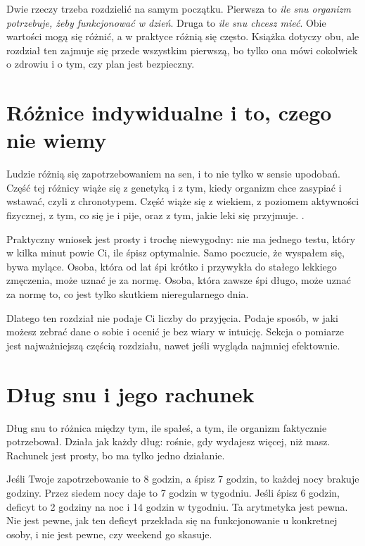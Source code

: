 Dwie rzeczy trzeba rozdzielić na samym początku. Pierwsza to \emph{ile snu organizm potrzebuje, żeby funkcjonować w dzień}. Druga to \emph{ile snu chcesz mieć}. Obie wartości mogą się różnić, a w praktyce różnią się często. Książka dotyczy obu, ale rozdział ten zajmuje się przede wszystkim pierwszą, bo tylko ona mówi cokolwiek o zdrowiu i o tym, czy plan jest bezpieczny.

\section{Różnice indywidualne i to, czego nie wiemy}

Ludzie różnią się zapotrzebowaniem na sen, i to nie tylko w sensie upodobań. Część tej różnicy wiąże się z genetyką i z tym, kiedy organizm chce zasypiać i wstawać, czyli z chronotypem. Część wiąże się z wiekiem, z poziomem aktywności fizycznej, z tym, co się je i pije, oraz z tym, jakie leki się przyjmuje. .

Praktyczny wniosek jest prosty i trochę niewygodny: nie ma jednego testu, który w kilka minut powie Ci, ile śpisz optymalnie. Samo poczucie, że \glqq wyspałem się\grqq{}, bywa mylące. Osoba, która od lat śpi krótko i przywykła do stałego lekkiego zmęczenia, może uznać je za normę. Osoba, która zawsze śpi długo, może uznać za normę to, co jest tylko skutkiem nieregularnego dnia.

Dlatego ten rozdział nie podaje Ci liczby do przyjęcia. Podaje sposób, w jaki możesz zebrać dane o sobie i ocenić je bez wiary w intuicję. Sekcja o pomiarze jest najważniejszą częścią rozdziału, nawet jeśli wygląda najmniej efektownie.

\section{Dług snu i jego rachunek}

Dług snu to różnica między tym, ile spałeś, a tym, ile organizm faktycznie potrzebował. Działa jak każdy dług: rośnie, gdy wydajesz więcej, niż masz. Rachunek jest prosty, bo ma tylko jedno działanie.

Jeśli Twoje zapotrzebowanie to 8 godzin, a śpisz 7 godzin, to każdej nocy brakuje godziny. Przez siedem nocy daje to 7 godzin w tygodniu. Jeśli śpisz 6 godzin, deficyt to 2 godziny na noc i 14 godzin w tygodniu. Ta arytmetyka jest pewna. Nie jest pewne, jak ten deficyt przekłada się na funkcjonowanie u konkretnej osoby, i nie jest pewne, czy weekend go skasuje.

